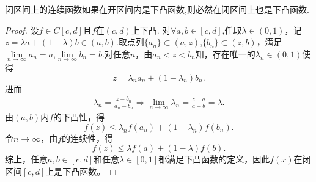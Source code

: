 \documentclass[../../main.tex]{subfiles}%
\begin{document}
\begin{proposition}\label{proposition:开区间下凸闭区间连续的函数在闭区间上仍然下凸}
闭区间上的连续函数如果在开区间内是下凸函数,则必然在闭区间上也是下凸函数.
\end{proposition}
\begin{proof}

设$f\in C[c,d]$且$f$在$(c,d)$上下凸.
对$\forall a,b\in [c,d]$,任取$\lambda \in (0,1)$，记$z = \lambda a + (1-\lambda) b \in (a,b)$.取点列$\{a_n\} \subset (a,z)$,$\{b_n\} \subset (z,b)$，满足$\lim\limits_{n \to \infty} a_n = a$,$\lim\limits_{n \to \infty} b_n = b$.对任意$n$，由$a_n < z < b_n$知，存在唯一的$\lambda_n \in (0,1)$使得
$$
z = \lambda_n a_n + (1-\lambda_n) b_n.
$$
进而
\begin{align*}
\lambda _n=\frac{z-b_n}{a_n-b_n}\Longrightarrow \underset{n\rightarrow \infty}{\lim}\lambda _n=\frac{z-a}{a-b}=\lambda .
\end{align*}
由$(a,b)$内$f$的下凸性，得
$$
f(z) \leqslant \lambda_n f(a_n) + (1-\lambda_n) f(b_n).
$$
令$n \to \infty$，由$f$的连续性，得
$$f(z) \leqslant \lambda f(a) + (1-\lambda) f(b) .$$
综上，任意$a,b \in [c,d]$和任意$\lambda \in [0,1]$都满足下凸函数的定义，因此$f(x)$在闭区间$[c,d]$上是下凸函数。

\end{proof}
\end{document}
